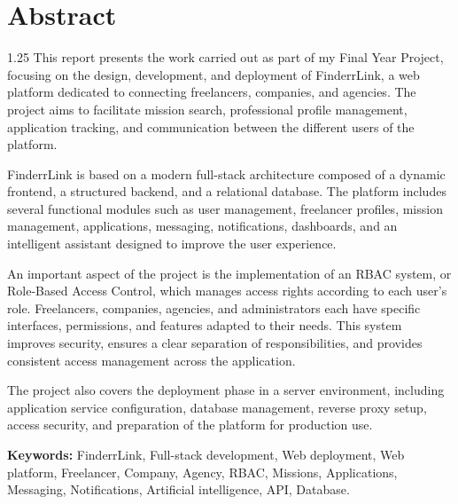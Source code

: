 \section*{\Huge Abstract}

\vspace{0.7cm}

\begin{spacing}{1.25}
This report presents the work carried out as part of my Final Year Project, focusing on the design, development, and deployment of FinderrLink, a web platform dedicated to connecting freelancers, companies, and agencies. The project aims to facilitate mission search, professional profile management, application tracking, and communication between the different users of the platform.

FinderrLink is based on a modern full-stack architecture composed of a dynamic frontend, a structured backend, and a relational database. The platform includes several functional modules such as user management, freelancer profiles, mission management, applications, messaging, notifications, dashboards, and an intelligent assistant designed to improve the user experience.

An important aspect of the project is the implementation of an RBAC system, or Role-Based Access Control, which manages access rights according to each user’s role. Freelancers, companies, agencies, and administrators each have specific interfaces, permissions, and features adapted to their needs. This system improves security, ensures a clear separation of responsibilities, and provides consistent access management across the application.

The project also covers the deployment phase in a server environment, including application service configuration, database management, reverse proxy setup, access security, and preparation of the platform for production use.
\end{spacing}

\vspace{0.4cm}
\noindent \textbf{Keywords:} FinderrLink, Full-stack development, Web deployment, Web platform, Freelancer, Company, Agency, RBAC, Missions, Applications, Messaging, Notifications, Artificial intelligence, API, Database.
